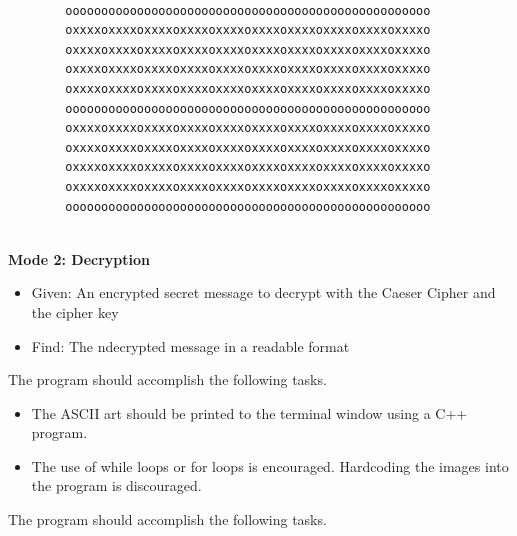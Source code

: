 \documentclass[12pt]{article}
\begin{document}
\begin{description}[labelindent=1cm]
\begin{itemize}
		\begin{lstlisting}
		
		ooooooooooooooooooooooooooooooooooooooooooooooooooo
		oxxxxoxxxxoxxxxoxxxxoxxxxoxxxxoxxxxoxxxxoxxxxoxxxxo
		oxxxxoxxxxoxxxxoxxxxoxxxxoxxxxoxxxxoxxxxoxxxxoxxxxo
		oxxxxoxxxxoxxxxoxxxxoxxxxoxxxxoxxxxoxxxxoxxxxoxxxxo
		oxxxxoxxxxoxxxxoxxxxoxxxxoxxxxoxxxxoxxxxoxxxxoxxxxo
		ooooooooooooooooooooooooooooooooooooooooooooooooooo
		oxxxxoxxxxoxxxxoxxxxoxxxxoxxxxoxxxxoxxxxoxxxxoxxxxo
		oxxxxoxxxxoxxxxoxxxxoxxxxoxxxxoxxxxoxxxxoxxxxoxxxxo
		oxxxxoxxxxoxxxxoxxxxoxxxxoxxxxoxxxxoxxxxoxxxxoxxxxo
		oxxxxoxxxxoxxxxoxxxxoxxxxoxxxxoxxxxoxxxxoxxxxoxxxxo
		ooooooooooooooooooooooooooooooooooooooooooooooooooo
		
		\end{lstlisting}
		
	
		
		 
	\end{itemize}

	{\bf Mode 2: Decryption}
	\begin{itemize}
		
		\item Given: An encrypted secret message to decrypt with the Caeser Cipher and the cipher key
		
		\item Find: The ndecrypted message in a readable format
		
	\end{itemize}

\newpage
\item[\textbf{\underline{Program Minimum Requirements:}}] \hfill \vspace{0mm}

The program should accomplish the following tasks. 

\begin{itemize}

	\item The ASCII art should be printed to the terminal window using a C++ program.

	\item The use of while loops or for loops is encouraged. Hardcoding the images into the program is discouraged.
	
\end{itemize}

\item[\textbf{\underline{Program Additional Requirements:}}] \hfill \vspace{0mm}

The program should accomplish the following tasks. 


\end{description}
\end{document}
